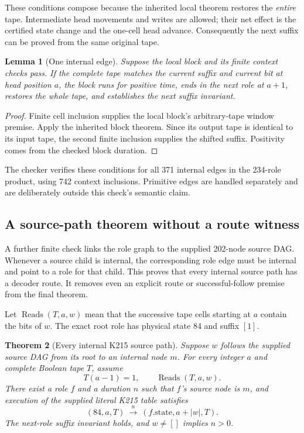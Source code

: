 \documentclass[11pt]{article}
\newtheorem{theorem}{Theorem}[section]
\newtheorem{lemma}[theorem]{Lemma}
\theoremstyle{remark}
\begin{document}
These conditions compose because the inherited local theorem restores
the \emph{entire} tape. Intermediate head movements and writes are allowed;
their net effect is the certified state change and the one-cell head
advance. Consequently the next suffix can be proved from the same original
tape.

\begin{lemma}[One internal edge]
Suppose the local block and its finite context checks pass.
If the complete tape matches the current suffix and current bit at head
position \(a\), the block runs for positive time, ends in the next role at
\(a+1\), restores the whole tape, and establishes the next suffix invariant.
\end{lemma}

\begin{proof}
Finite cell inclusion supplies the local block's arbitrary-tape window
premise. Apply the inherited block theorem. Since its output tape is
identical to its input tape, the second finite inclusion supplies the
shifted suffix. Positivity comes from the checked block duration.
\end{proof}

The checker verifies these conditions for all 371 internal edges in the
234-role product, using 742 context inclusions. Primitive edges are handled
separately and are deliberately outside this check's semantic claim.

\subsection{A source-path theorem without a route witness}

A further finite check links the role graph to the supplied 202-node source
DAG. Whenever a source child is internal, the corresponding role edge must
be internal and point to a role for that child. This proves that every
internal source path has a decoder route. It removes even an explicit
route or successful-follow premise from the final theorem.

Let \(\operatorname{Reads}(T,a,w)\) mean that the successive tape cells
starting at \(a\) contain the bits of \(w\).
The exact root role has physical state 84 and suffix \([1]\).

\begin{theorem}[Every internal K215 source path]
\label{thm:decoder}
Suppose \(w\) follows the supplied source DAG from its root to an internal
node \(m\). For every integer \(a\) and complete Boolean tape \(T\), assume
\[
T(a-1)=1,\qquad \operatorname{Reads}(T,a,w).
\]
There exist a role \(f\) and a duration \(n\) such that \(f\)'s source node is
\(m\), and execution of the supplied literal K215 table satisfies
\[
(84,a,T)\ \xrightarrow{\ n\ }\ (f.\mathrm{state},a+|w|,T).
\]
The next-role suffix invariant holds, and \(w\ne[]\) implies \(n>0\).
\end{theorem}
\end{document}

